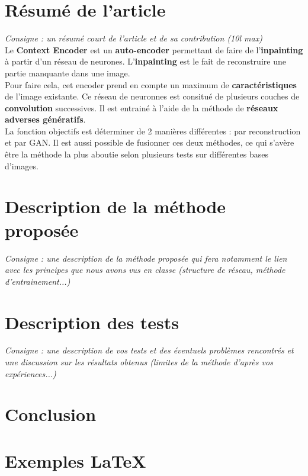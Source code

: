 \documentclass[11pt,a4paper]{article}
\begin{document}
    \section{Résumé de l'article}
    \emph{Consigne : un résumé court de l'article et de sa contribution (10l max)}\\
    Le \textbf{Context Encoder} est un \textbf{auto-encoder} permettant de faire de l'\textbf{inpainting} à partir d'un réseau de neurones. L'\textbf{inpainting} est le fait de reconstruire une partie manquante dans une image.\\
    Pour faire cela, cet encoder prend en compte un maximum de \textbf{caractéristiques} de l'image existante. Ce réseau de neuronnes est consitué de plusieurs couches de \textbf{convolution} successives. Il est entrainé à l'aide de la méthode de \textbf{réseaux adverses génératifs}.\\
    La fonction objectifs est déterminer de 2 manières différentes : par reconstruction et par GAN. Il est aussi possible de fusionner ces deux méthodes, ce qui s'avère être la méthode la plus aboutie selon plusieurs tests sur différentes bases d'images.
    
    \section{Description de la 	méthode proposée}
    \emph{Consigne : une description de la méthode proposée qui fera notamment le lien avec les principes que nous avons vus en classe (structure de réseau, méthode d'entrainement...)}

    \section{Description des tests}
    \emph{Consigne : une description de vos tests et des éventuels problèmes rencontrés et une discussion sur les résultats obtenus (limites de la méthode d'après vos expériences...)}

    \section{Conclusion}


    \section{Exemples \LaTeX}
\end{document}
